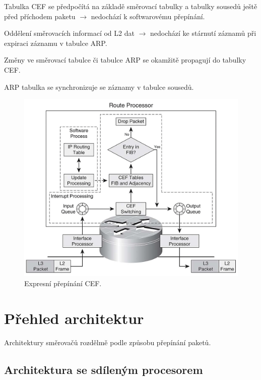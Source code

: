 
\begin{compactitem}
    \item Tabulka CEF se předpočítá na základě směrovací tabulky a tabulky sousedů ještě před příchodem paketu $\rightarrow$ nedochází k softwarovému přepínání.
    \item Oddělení směrovacích informací od L2 dat $\rightarrow$ nedochází ke stárnutí záznamů při expiraci záznamu v tabulce ARP.
    \item Změny ve směrovací tabulce či tabulce ARP se okamžitě propagují do tabulky CEF.
    \item ARP tabulka se synchronizuje se záznamy v tabulce sousedů.
\end{compactitem}

\begin{figure}[H]
    \centering
    \includegraphics[width=1\linewidth]{expresni_prepinani.png}
    \caption{Expresní přepínání CEF.}
\end{figure}


\section{Přehled architektur}

Architektury směrovačů rozdělmě podle způsobu přepínání paketů.

\subsection{Architektura se sdíleným procesorem}

